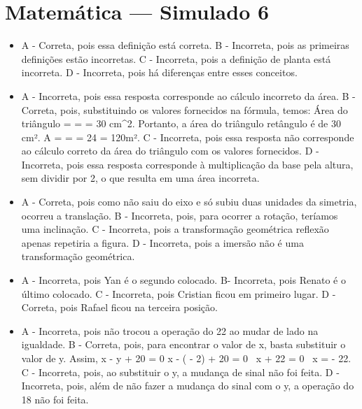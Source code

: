 \section*{Matemática — Simulado 6} 
\begin{itemize}
\item A - Correta, pois essa definição está correta.
B - Incorreta, pois as primeiras definições estão incorretas.
C - Incorreta, pois a definição de planta está incorreta.
D - Incorreta, pois há diferenças entre esses conceitos.
\item A - Incorreta, pois essa resposta corresponde ao cálculo incorreto da
área.
B - Correta, pois, substituindo os valores fornecidos na fórmula, temos:
Área do triângulo =  =  =
30 \;cm^2. Portanto, a área do triângulo retângulo é de 30 cm².
A =  =  = 24  = 120m².
C - Incorreta, pois essa resposta não corresponde ao cálculo correto da
área do triângulo com os valores fornecidos.
D - Incorreta, pois essa resposta corresponde à multiplicação da base
pela altura, sem dividir por 2, o que resulta em uma área incorreta.
\item A - Correta, pois como não saiu do eixo e só subiu duas unidades da
simetria, ocorreu a translação.
B - Incorreta, pois, para ocorrer a rotação, teríamos uma inclinação.
C - Incorreta, pois a transformação geométrica reflexão apenas repetiria
a figura.
D - Incorreta, pois a imersão não é uma transformação geométrica.
\item A - Incorreta, pois Yan é o segundo colocado.
B- Incorreta, pois Renato é o último colocado.
C - Incorreta, pois Cristian ficou em primeiro lugar.
D - Correta, pois Rafael ficou na terceira posição.
\item A - Incorreta, pois não trocou a operação do 22 ao mudar de lado na
igualdade.
B - Correta, pois, para encontrar o valor de x, basta substituir o valor
de y. Assim, x - y + 20 = 0 \rightarrow x - ( - 2) + 20 = 0 \rightarrow \ x + 22 = 0 \rightarrow \ x = - 22.
C - Incorreta, pois, ao substituir o y, a mudança de sinal não foi
feita.
D - Incorreta, pois, além de não fazer a mudança do sinal com o y, a
operação do 18 não foi feita.
\end{itemize}


